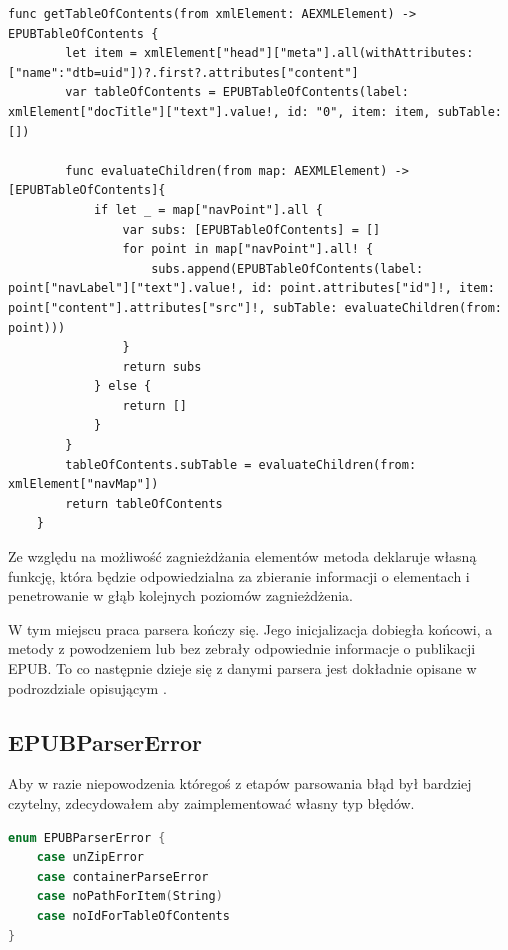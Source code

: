 \begin{lstlisting}[caption={Implementacja metody getTableOfContents(from xmlElement:).},language=swift-reference]
    func getTableOfContents(from xmlElement: AEXMLElement) -> EPUBTableOfContents {
        let item = xmlElement["head"]["meta"].all(withAttributes: ["name":"dtb=uid"])?.first?.attributes["content"]
        var tableOfContents = EPUBTableOfContents(label: xmlElement["docTitle"]["text"].value!, id: "0", item: item, subTable: [])

        func evaluateChildren(from map: AEXMLElement) -> [EPUBTableOfContents]{
            if let _ = map["navPoint"].all {
                var subs: [EPUBTableOfContents] = []
                for point in map["navPoint"].all! {
                    subs.append(EPUBTableOfContents(label: point["navLabel"]["text"].value!, id: point.attributes["id"]!, item: point["content"].attributes["src"]!, subTable: evaluateChildren(from: point)))
                }
                return subs
            } else {
                return []
            }
        }
        tableOfContents.subTable = evaluateChildren(from: xmlElement["navMap"])
        return tableOfContents
    }
\end{lstlisting}

Ze względu na możliwość zagnieżdżania elementów metoda deklaruje własną funkcję, która będzie odpowiedzialna za zbieranie informacji o elementach i penetrowanie w głąb kolejnych poziomów zagnieżdżenia.

W tym miejscu praca parsera kończy się. Jego inicjalizacja dobiegła końcowi, a metody z powodzeniem lub bez zebrały odpowiednie informacje o publikacji EPUB. To co następnie dzieje się z danymi parsera jest dokładnie opisane w podrozdziale opisującym .

\subsection{EPUBParserError}

Aby w razie niepowodzenia któregoś z etapów parsowania błąd był bardziej czytelny, zdecydowałem aby zaimplementować własny typ błędów.

\begin{lstlisting}[caption={Enumeracja EPUBParserError.},language=swift]
enum EPUBParserError {
    case unZipError
    case containerParseError
    case noPathForItem(String)
    case noIdForTableOfContents
}
\end{lstlisting}

